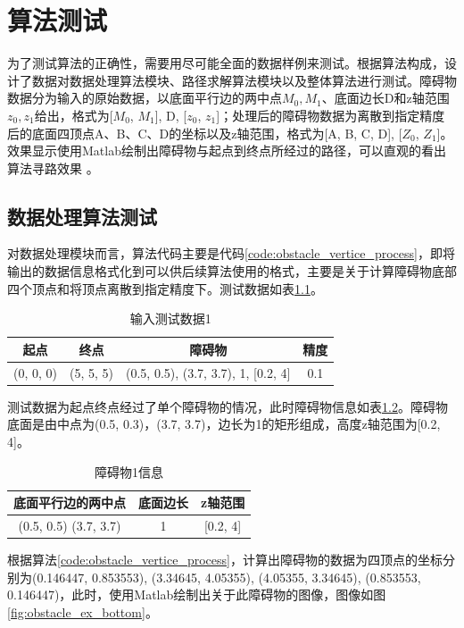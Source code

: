 \chapter{算法测试}
\par 为了测试算法的正确性，需要用尽可能全面的数据样例来测试。根据算法构成，设计了数据对数据处理算法模块、路径求解算法模块以及整体算法进行测试。障碍物数据分为输入的原始数据，以底面平行边的两中点$M_0,M_1$、底面边长D和z轴范围$z_0,z_1$给出，格式为[$M_0$, $M_1$], D, [$z_0$, $z_1$]；处理后的障碍物数据为离散到指定精度后的底面四顶点A、B、C、D的坐标以及z轴范围，格式为[A, B, C, D], [$Z_0$, $Z_1$]。效果显示使用Matlab绘制出障碍物与起点到终点所经过的路径，可以直观的看出算法寻路效果 \cite{r7}。

\section{数据处理算法测试}
\par 对数据处理模块而言，算法代码主要是代码\ref{code:obstacle_vertice_process}，即将输出的数据信息格式化到可以供后续算法使用的格式，主要是关于计算障碍物底部四个顶点和将顶点离散到指定精度下。测试数据如表\ref{tab:process_input_test_data1}。
\begin{table}[htb]
    \centering
    \caption{输入测试数据1}
    \label{tab:process_input_test_data1}
    \begin{tabular}{cccc}
        \toprule
        起点&终点&障碍物&精度\\
        \midrule
        (0, 0, 0)&(5, 5, 5)&(0.5, 0.5), (3.7, 3.7), 1, [0.2, 4]&0.1\\
        \bottomrule
    \end{tabular}
\end{table}
测试数据为起点终点经过了单个障碍物的情况，此时障碍物信息如表\ref{tab:process_input_test_data1_obstacle1}。障碍物底面是由中点为(0.5, 0.3)，(3.7, 3.7)，边长为1的矩形组成，高度z轴范围为[0.2, 4]。
\begin{table}[htb]
    \centering
    \caption{障碍物1信息}
    \label{tab:process_input_test_data1_obstacle1}
    \begin{tabular}{ccc}
        \toprule
        底面平行边的两中点&底面边长&z轴范围\\
        \midrule
        (0.5, 0.5) (3.7, 3.7)&1&[0.2, 4]\\
        \bottomrule
    \end{tabular}
\end{table}
根据算法\ref{code:obstacle_vertice_process}，计算出障碍物的数据为四顶点的坐标分别为(0.146447, 0.853553), (3.34645, 4.05355), (4.05355, 3.34645), (0.853553, 0.146447)，此时，使用Matlab绘制出关于此障碍物的图像，图像如图\ref{fig:obstacle_ex_bottom}。
